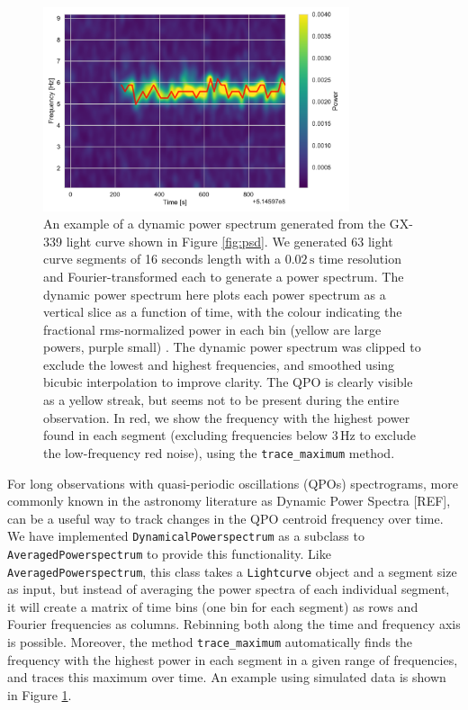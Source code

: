 \documentclass[twocolumn]{aastex62}
\newcommand{\lightcurve}{\texttt{Lightcurve}\xspace}
\begin{document}
\begin{figure}[htbp]
\begin{center}
\includegraphics[width=9cm]{../figures/dyn_spec.pdf}
\caption{An example of a dynamic power spectrum generated from the GX-339 light curve shown in Figure \ref{fig:psd}. We generated 63 light curve segments of 16 seconds length with a $0.02\,\mathrm{s}$ time resolution and Fourier-transformed each to generate a power spectrum. The dynamic power spectrum here plots each power spectrum as a vertical slice as a function of time, with the colour indicating the fractional rms-normalized power in each bin (yellow are large powers, purple small) . The dynamic power spectrum was clipped to exclude the lowest and highest frequencies, and smoothed using bicubic interpolation to improve clarity. The QPO is clearly visible as a yellow streak, but seems not to be present during the entire observation. In red, we show the frequency with the highest power found in each segment (excluding frequencies below $3\,\mathrm{Hz}$ to exclude the low-frequency red noise), using the \texttt{trace_maximum} method.}
\label{fig:dynspec}
\end{center}
\end{figure}

For long observations with quasi-periodic oscillations (QPOs) spectrograms, more commonly known in the astronomy literature as Dynamic Power Spectra [REF], can be a useful way to track changes in the QPO centroid frequency over time. We have implemented \texttt{DynamicalPowerspectrum} as a subclass to \texttt{AveragedPowerspectrum} to provide this functionality. Like \texttt{AveragedPowerspectrum}, this class takes a \lightcurve object and a segment size as input, but instead of averaging the power spectra of each individual segment, it will create a matrix of time bins (one bin for each segment) as rows and Fourier frequencies as columns. Rebinning both along the time and frequency axis is possible. Moreover, the method \texttt{trace_maximum} automatically finds the frequency with the highest power in each segment in a given range of frequencies, and traces this maximum over time. An example using simulated data is shown in Figure \ref{fig:dynspec}.
\end{document}
